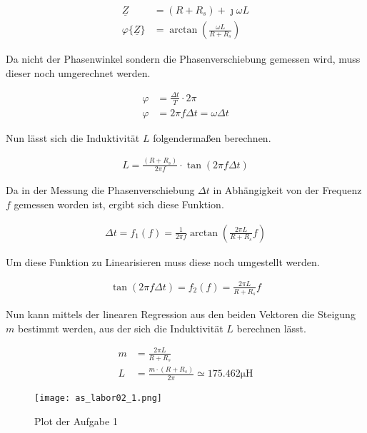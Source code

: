 \begin{equation} \label{eq214}
    \begin{split}
        \underline{Z} &= (R + R_s) + \jmath \omega L\\
        \varphi\{\underline{Z} \} &= \arctan \left( \frac{\omega L}{ R + R_s} \right)
    \end{split}
\end{equation}

Da nicht der Phasenwinkel sondern die Phasenverschiebung gemessen wird,
muss dieser noch umgerechnet werden.

\begin{equation} \label{eq215}
    \begin{split}
        \varphi &= \frac{\Delta t}{T} \cdot 2 \pi \\
        \varphi &= 2 \pi f \Delta t = \omega \Delta t
    \end{split}
\end{equation}

Nun lässt sich die Induktivität $L$ folgendermaßen berechnen.

\begin{equation} \label{eq216}
    \begin{split}
        L = \frac{(R+R_s) }{2 \pi f} \cdot \tan(2 \pi f \Delta t)
    \end{split}
\end{equation}

Da in der Messung die Phasenverschiebung $\Delta t$ in Abhängigkeit
von der Frequenz $f$ gemessen worden ist, ergibt sich diese Funktion.

\begin{equation} \label{eq217}
    \begin{split}
       \Delta t = f_1(f) = \frac{1}{2 \pi f} \arctan \left( \frac{2 \pi L}{R + R_s} f \right)
    \end{split}
\end{equation}

Um diese Funktion zu Linearisieren muss diese noch umgestellt werden.

\begin{equation} \label{eq218}
    \begin{split}
       \tan(2 \pi f \Delta t) = f_2(f) = \frac{2 \pi L}{R + R_s} f
    \end{split}
\end{equation}

Nun kann mittels der linearen Regression aus den beiden Vektoren die Steigung
$m$ bestimmt werden, aus der sich die Induktivität $L$ berechnen lässt.

\begin{equation} \label{eq219}
    \begin{split}
       m &=  \frac{2 \pi L}{R + R_s}\\
       L &= \frac{m \cdot (R+R_s)}{2 \pi} \simeq 175.462 \mathrm{\mu H}
    \end{split}
\end{equation}


\begin{figure}[H]
 \centering
    \texttt{[image: as\_labor02\_1.png]}
 \caption{Plot der Aufgabe 1}
 \label{fig:PlotAufgabe1}
\end{figure}